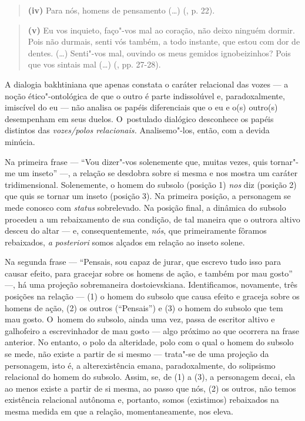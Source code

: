 \begin{quote}
\textbf{(iv)} Para nós, homens de pensamento (\ldots) (, p. 22).
\end{quote}

\begin{quote}
\textbf{(v)} Eu vos inquieto, faço"-vos mal ao coração, não deixo ninguém
dormir. Pois não durmais, senti vós também, a todo instante, que estou
com dor de dentes. (\ldots) Senti"-vos mal, ouvindo os meus gemidos
ignobeizinhos? Pois que vos sintais mal (\ldots) (, pp. 27-28).
\end{quote}

A dialogia bakhtiniana que apenas constata o caráter relacional das
vozes --- a noção ético"-ontológica de que o outro é parte indissolúvel e,
paradoxalmente, imiscível do eu --- não analisa os papéis diferenciais
que o eu e o(s) outro(s) desempenham em seus duelos. O~postulado
dialógico desconhece os papéis distintos das \emph{vozes/polos
relacionais.} Analisemo"-los, então, com a devida minúcia.

Na primeira frase --- ``Vou dizer"-vos solenemente que, muitas vezes, quis
tornar"-me um inseto'' ---, a relação se desdobra sobre si mesma e nos
mostra um caráter tridimensional. Solenemente, o homem do subsolo
(posição 1) \emph{nos} diz (posição 2) que quis se tornar um inseto
(posição 3). Na primeira posição, a personagem se mede conosco com
\emph{status} sobrelevado. Na posição final, a dinâmica do subsolo
procedeu a um rebaixamento de sua condição, de tal maneira que o outrora
altivo desceu do altar --- e, consequentemente, \emph{nós}, que
primeiramente fôramos rebaixados, \emph{a posteriori} somos alçados em
relação ao inseto solene.

Na segunda frase --- ``Pensais, sou capaz de jurar, que escrevo tudo isso
para causar efeito, para gracejar sobre os homens de ação, e também por
mau gosto'' ---, há uma projeção sobremaneira dostoievskiana.
Identificamos, novamente, três posições na relação --- (1) o homem do
subsolo que causa efeito e graceja sobre os homens de ação, (2) os
outros (``Pensais'') e (3) o homem do subsolo que tem mau gosto. O~homem
do subsolo, ainda uma vez, passa de escritor altivo e galhofeiro a
escrevinhador de mau gosto --- algo próximo ao que ocorrera na frase
anterior. No entanto, o polo da alteridade, polo com o qual o homem do
subsolo se mede, não existe a partir de si mesmo --- trata"-se de uma
projeção da personagem, isto é, a alterexistência emana, paradoxalmente,
do solipsismo relacional do homem do subsolo. Assim, se, de (1) a (3), a
personagem decai, ela ao menos existe a partir de si mesma, ao passo que
nós, (2) os outros, não temos existência relacional autônoma e,
portanto, somos (existimos) rebaixados na mesma medida em que a relação,
momentaneamente, nos eleva.

